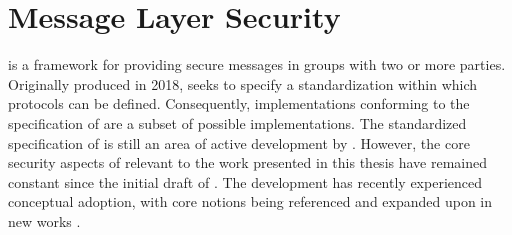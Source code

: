 \hypertarget{sec:message-layer-security}{%
\section{Message Layer Security}\label{sec:message-layer-security}}

 \autocite{Omara2020} is a framework for providing secure messages in groups with two or more parties.
Originally produced in 2018,  seeks to specify a standardization within which  protocols can be defined.
Consequently, implementations conforming to the specification of  are a subset of possible  implementations.
The standardized specification of  is still an area of active development by .
However, the core security aspects of  relevant to the work presented in this thesis have remained constant since the initial draft of .
The  development has recently experienced conceptual adoption, with core notions being referenced and expanded upon in new works \autocite{Boyd2020}.

